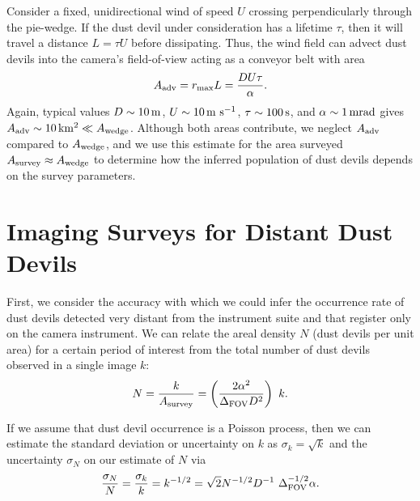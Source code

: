 \documentclass{aastex63}
\begin{document}
Consider a fixed, unidirectional wind of speed $U$ crossing perpendicularly through the pie-wedge. If the dust devil under consideration has a lifetime $\tau$, then it will travel a distance $L = \tau U$ before dissipating. Thus, the wind field can advect dust devils into the camera's field-of-view acting as a conveyor belt with area
\begin{equation}
    A_{\rm adv} = r_{\rm max} L = \frac{D U \tau}{\alpha}.
    \label{eqn:A_adv}
\end{equation}
Again, typical values $D \sim 10\,{\rm m}$, $U \sim 10\,{\rm m\ s^{-1}}$, $\tau \sim 100\,{\rm s}$, and $\alpha \sim 1\,{\rm mrad}$ gives $A_{\rm adv} \sim 10\,{\rm km^2} \ll A_{\rm wedge}$. Although both areas contribute, we neglect $A_{\rm adv}$ compared to $A_{\rm wedge}$, and we use this estimate for the area surveyed $A_{\rm survey} \approx A_{\rm wedge}$ to determine how the inferred population of dust devils depends on the survey parameters.

\section{Imaging Surveys for Distant Dust Devils}
First, we consider the accuracy with which we could infer the occurrence rate of dust devils detected very distant from the instrument suite and that register only on the camera instrument. We can relate the areal density $N$ (dust devils per unit area) for a certain period of interest from the total number of dust devils observed in a single image $k$:
\begin{equation}
   N = \frac{k}{A_{\rm survey}} = \left( \frac{2 \alpha^2}{\Delta_{\rm FOV} D^2} \right)\ k.
    \label{eqn:areal_occurrence}
\end{equation}

If we assume that dust devil occurrence is a Poisson process, then we can estimate the standard deviation or uncertainty on $k$ as $\sigma_k = \sqrt{k}$ and the uncertainty $\sigma_N$ on our estimate of $N$ via
\begin{equation}
    \frac{\sigma_N}{N} = \frac{\sigma_k}{k} = k^{-1/2} = \sqrt{2} N^{-1/2} D^{-1}\ \Delta_{\rm FOV}^{-1/2} \alpha.
    \label{eqn:sigma_N}
\end{equation}
\end{document}
